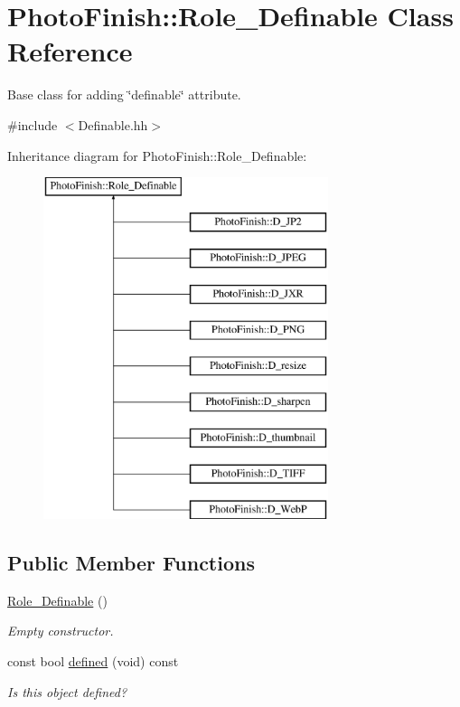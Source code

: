 \hypertarget{class_photo_finish_1_1_role___definable}{}\section{Photo\+Finish\+:\+:Role\+\_\+\+Definable Class Reference}
\label{class_photo_finish_1_1_role___definable}


Base class for adding \char`\"{}definable\char`\"{} attribute.  




{\ttfamily \#include $<$Definable.\+hh$>$}

Inheritance diagram for Photo\+Finish\+:\+:Role\+\_\+\+Definable\+:\begin{figure}[H]
\begin{center}
\leavevmode
\includegraphics[height=10.000000cm]{class_photo_finish_1_1_role___definable}
\end{center}
\end{figure}
\subsection*{Public Member Functions}
\begin{DoxyCompactItemize}
\item 
\hyperlink{class_photo_finish_1_1_role___definable_ab62a627af4d4cc37e7dfe47b4ca59ac8}{Role\+\_\+\+Definable} ()
\begin{DoxyCompactList}\small\item\em Empty constructor. \end{DoxyCompactList}\item 
const bool \hyperlink{class_photo_finish_1_1_role___definable_aa97a971292af1ea6f5aa35f5e3bf659c}{defined} (void) const
\begin{DoxyCompactList}\small\item\em Is this object defined? \end{DoxyCompactList}\end{DoxyCompactItemize}
